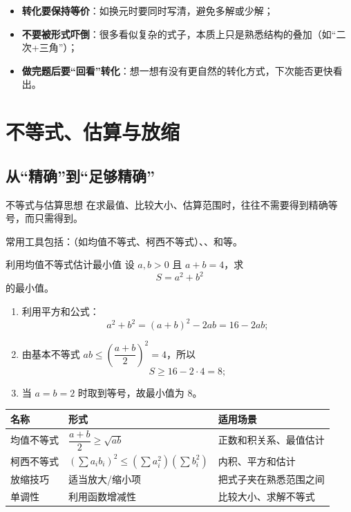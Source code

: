 \documentclass[a4paper,11pt]{ctexart}
\begin{document}
\begin{itemize}
  \item \textbf{转化要保持等价}：如换元时要同时写清，避免多解或少解；
  \item \textbf{不要被形式吓倒}：很多看似复杂的式子，本质上只是熟悉结构的叠加（如“二次+三角”）；
  \item \textbf{做完题后要“回看”转化}：想一想有没有更自然的转化方式，下次能否更快看出。
\end{itemize}

\section{不等式、估算与放缩}

\subsection{从“精确”到“足够精确”}

\begin{definitionbox}{不等式与估算思想}
在求最值、比较大小、估算范围时，往往不需要得到精确等号，而只需得到。
\par
常用工具包括：（如均值不等式、柯西不等式）、、和等。
\end{definitionbox}

\begin{examplebox}{利用均值不等式估计最小值}
设 $a,b>0$ 且 $a+b=4$，求
\[
S=a^2+b^2
\]
的最小值。

\begin{enumerate}
  \item 利用平方和公式：
  \[
  a^2+b^2=(a+b)^2-2ab=16-2ab;
  \]
  \item 由基本不等式 $ab\le \left(\dfrac{a+b}{2}\right)^2=4$，所以
  \[
  S\ge 16-2\cdot 4=8;
  \]
  \item 当 $a=b=2$ 时取到等号，故最小值为 $8$。
\end{enumerate}
\end{examplebox}

\begin{center}

\vspace{0.5em}
\begin{tabular}{p{} p{} p{}}
\hline
\textbf{名称} & \textbf{形式} & \textbf{适用场景} \\
\hline
均值不等式 & $\dfrac{a+b}{2}\ge\sqrt{ab}$ & 正数和积关系、最值估计 \\
柯西不等式 & $(\sum a_ib_i)^2\le(\sum a_i^2)(\sum b_i^2)$ & 内积、平方和估计 \\
放缩技巧 & 适当放大/缩小项 & 把式子夹在熟悉范围之间 \\
单调性 & 利用函数增减性 & 比较大小、求解不等式 \\
\hline
\end{tabular}
\end{center}
\end{document}
